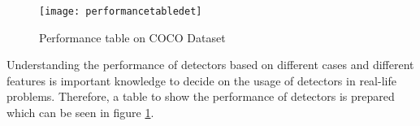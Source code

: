 \documentclass{article}
\begin{document}
\setlength{\parindent}{6ex}

\begin{figure}
    \centering
    \texttt{[image: performancetabledet]}
    \caption{Performance table on COCO Dataset}
    \label{fig:performancetable1}
\end{figure}

\indent

Understanding the performance of detectors based on different cases and different 
features is important knowledge to decide on the usage of detectors in real-life problems. 
Therefore, a table to show the performance of detectors is prepared which can be 
seen in figure \ref{fig:performancetable1}.
\end{document}
